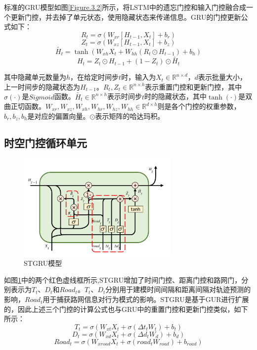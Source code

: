 \documentclass[master]{thesis-uestc}
\begin{document}
标准的GRU模型如图\ref{Figure.3.2}所示，将LSTM中的遗忘门控和输入门控融合成一个更新门控，并去掉了单元状态，使用隐藏状态来传递信息。GRU的门控更新公式如下：
\begin{equation}
   R_t = \sigma(W_{xr}[H_{t-1},X_t]+b_r)
\end{equation}
\begin{equation}
   Z_t = \sigma(W_{xz}[H_{t-1},X_t]+b_z)
\end{equation}
\begin{equation}
   \tilde{H_t} = \tanh(W_{xh}X_t + W_{hh}(R_t \odot H_{t-1})+b_h)
\label{eq.3.1}
\end{equation}
\begin{equation}
  H_t = Z_t\odot H_{t-1}+(1-Z_t)\odot \tilde{H_t}
\label{eq.3.2}
\end{equation}

其中隐藏单元数量为$h$，在给定时间步$t$时，输入为$X_t\in \mathbb{R}^{n\times d}$，$d$表示批量大小，上一时间步的隐藏状态为$H_{t-1}$。$R_t,Z_t \in \mathbb{R}^{n\times h}$表示重置门控和更新门控，其中$\sigma(\cdot)$是$Sigmoid$函数。$\tilde{H_t}\in \mathbb{R}^{n\times h}$表示时间步$t$时的隐藏状态，其中$\tanh(\cdot)$是双曲正切函数。$W_{xr},W_{xz},W_{xh},W_{hr},W_{hz},W_{hh} \in \mathbb{R}^{d\times h}$则是各个门控的权重参数，$b_r,b_z,b_h$是对应的偏置向量。$\odot$表示矩阵的哈达玛积。

\subsection{时空门控循环单元}

\begin{figure}[!ht]
\centering 
\includegraphics[width=0.7\textwidth]{./pic/stgru_add_box.pdf}
\caption{STGRU模型}
\label{Figure.3.3}
\end{figure}

如图\ref{Figure.3.3}中的两个红色虚线框所示,STGRU增加了时间门控、距离门控和路网门，分别表示为$T_t$、$D_t$和$Road_t$。$T_t$、$D_t$分别用于建模时间间隔和距离间隔对轨迹预测的影响，$Road_t$用于捕获路网信息对行为模式的影响。STGRU是基于GUR进行扩展的，因此上述三个门控的计算公式也与GRU中的重置门控和更新门控类似，如下所示：
\begin{equation}
  T_t=\sigma(W_{xt}X_t+\sigma(\Delta t_tW_t)+b_t)
\end{equation}
\begin{equation}
  D_t=\sigma(W_{xd}X_t+\sigma(\Delta d_tW_d)+b_d)
\end{equation}
\begin{equation}
  Road_t=\sigma(W_{xroad}X_t+\sigma(road_tW_{road})+b_{road})
\end{equation}
\end{document}
